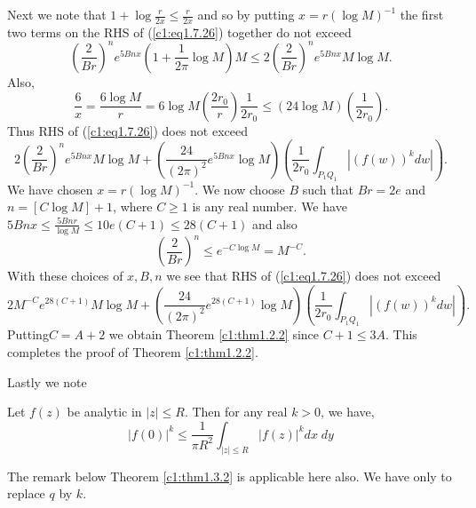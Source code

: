 Next we note that $1 + \log \frac{r}{2x} \leq \frac{r}{2x}$ and so by putting $x = r (\log M)^{-1}$ the first two terms on the RHS of (\ref{c1:eq1.7.26}) together do not exceed
$$
\left(\frac{2}{Br} \right)^n e^{5Bnx} \left(1+\frac{1}{2\pi} \log M\right) M \leq 2 \left(\frac{2}{Br} \right)^n e^{5Bnx} M \log M.
$$
Also,
$$
\frac{6}{x} = \frac{6 \log M}{r} = 6 \log M \left(\frac{2r_0}{r} \right) \frac{1}{2 r_0} \leq (24 \log M ) \left(\frac{1}{2r_0} \right).
$$
Thus RHS of (\ref{c1:eq1.7.26}) does not exceed
$$
2\left(\frac{2}{Br} \right)^n e^{5Bnx} M \log M + \left( \frac{24}{ (2 \pi)^2} e^{5 B nx} \log M\right)  \left( \frac{1}{2r_0} \int_{P_1 Q_1} |(f(w))^k dw|\right).
$$
We have chosen $x =r(\log M)^{-1}$. We now choose $B$ such that $Br = 2e$ and $n = [C \log M] +1$, where $C \geq 1$ is any real number. We have $5 B nx \leq \frac{5Bnr}{\log M} \leq 10 e(C+1) \leq 28 (C+1)$ and also
$$ 
\left(\frac{2}{Br} \right)^n \leq e^{-C \log M} = M^{-C}.
$$
With these choices of $x,B,n$ we see that RHS of (\ref{c1:eq1.7.26}) does not exceed
$$ 
2 M^{-C} e^{28(C+1)} M \log M + \left(\frac{24}{(2\pi)^2} e^{28(C+1) } \log M \right) \left( \frac{1}{2r_0} \int_{P_1Q_1} |(f(w))^k dw| \right).
$$
Putting\pageoriginale $C = A+2$ we obtain Theorem \ref{c1:thm1.2.2} since $C+1 \leq 3A$. This completes the proof of Theorem \ref{c1:thm1.2.2}.

Lastly we note

\begin{theorem}\label{c1:thm1.7.1}
Let $f(z)$ be analytic in $|z| \leq R$. Then for any real $k >0$, we have,
\begin{equation*}
|f(0)|^k \leq \frac{1}{\pi R^2} \int_{|z| \leq R} |f(z)|^k dx\; dy \tag{1.7.27}\label{c1:eq1.7.27}
\end{equation*}
\end{theorem}

\begin{remark*}
The remark below Theorem \ref{c1:thm1.3.2} is applicable here also. We have only to replace $q$ by $k$. 
\end{remark*}

